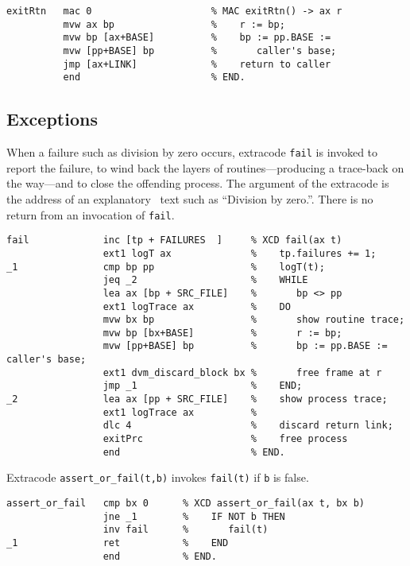 {\small
\begin{verbatim}
exitRtn   mac 0                     % MAC exitRtn() -> ax r
          mvw ax bp                 %    r := bp;
          mvw bp [ax+BASE]          %    bp := pp.BASE :=
          mvw [pp+BASE] bp          %       caller's base;
          jmp [ax+LINK]             %    return to caller
          end                       % END.
\end{verbatim}}



\subsection{Exceptions}\label{exceptions}
When a failure such as division by zero occurs, extracode \texttt{fail} is invoked to report the failure, to wind back the layers of routines---producing a trace-back on the way---and to close the offending process. The argument of the extracode is the address of an explanatory \desi\ text such as ``Division by zero.''. There is no return from an invocation of \texttt{fail}.

{\small
\begin{verbatim}
fail             inc [tp + FAILURES  ]     % XCD fail(ax t)
                 ext1 logT ax              %    tp.failures += 1;
_1               cmp bp pp                 %    logT(t);
                 jeq _2                    %    WHILE
                 lea ax [bp + SRC_FILE]    %       bp <> pp
                 ext1 logTrace ax          %    DO
                 mvw bx bp                 %       show routine trace;
                 mvw bp [bx+BASE]          %       r := bp;
                 mvw [pp+BASE] bp          %       bp := pp.BASE := caller's base;
                 ext1 dvm_discard_block bx %       free frame at r
                 jmp _1                    %    END;
_2               lea ax [pp + SRC_FILE]    %    show process trace;
                 ext1 logTrace ax          %
                 dlc 4                     %    discard return link;
                 exitPrc                   %    free process
                 end                       % END.
\end{verbatim}}

Extracode \texttt{assert\_or\_fail(t,b)} invokes \texttt{fail(t)} if \texttt{b} is false.

{\small
\begin{verbatim}
assert_or_fail   cmp bx 0      % XCD assert_or_fail(ax t, bx b)
                 jne _1        %    IF NOT b THEN
                 inv fail      %       fail(t)
_1               ret           %    END
                 end           % END.
\end{verbatim}}

